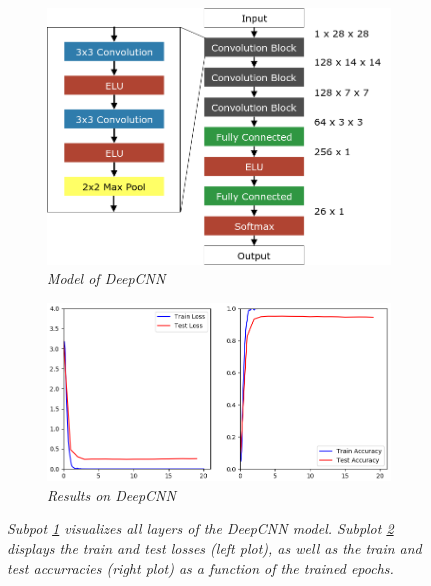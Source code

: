 \documentclass[a4paper]{article}
\begin{document}
\begin{figure}
    \centering
    \hspace{-1cm}
    \begin{subfigure}[b]{0.4\textwidth}
        \includegraphics[height=0.25\paperwidth]{graphics/nets/CNN13}
        \caption{\textit{Model of DeepCNN}}
        \label{fig:deepCNN_model}
    \end{subfigure}
    \begin{subfigure}[b]{0.5\textwidth}
        \includegraphics[height=0.25\paperwidth]{graphics/nets/CNN13_Results}
        \caption{\textit{Results on DeepCNN}}
        \label{fig:deepCNN_results}
    \end{subfigure}
    \caption{\textit{Subpot \ref{fig:deepCNN_model} visualizes all layers of the DeepCNN model. Subplot \ref{fig:deepCNN_results} displays the train and test losses (left plot), as well as the train and test accurracies (right plot) as a function of the trained epochs.}}\label{fig:deepCNN}
\end{figure}
\end{document}

